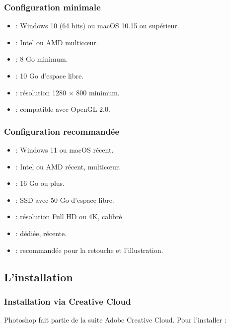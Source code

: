 \subsubsection{Configuration minimale}

\begin{itemize}
    \item {} : Windows 10 (64 bits) ou macOS 10.15 ou supérieur.
    \item {} : Intel ou AMD multicœur.
    \item {} : 8 Go minimum.
    \item {} : 10 Go d'espace libre.
    \item {} : résolution 1280 × 800 minimum.
    \item {} : compatible avec OpenGL 2.0.
\end{itemize}

\subsubsection{Configuration recommandée}

\begin{itemize}
    \item {} : Windows 11 ou macOS récent.
    \item {} : Intel ou AMD récent, multicœur.
    \item {} : 16 Go ou plus.
    \item {} : SSD avec 50 Go d'espace libre.
    \item {} : résolution Full HD ou 4K, calibré.
    \item {} : dédiée, récente.
    \item {} : recommandée pour la retouche et l'illustration.
\end{itemize}

\subsection{L'installation}

\subsubsection{Installation via Creative Cloud}

Photoshop fait partie de la suite Adobe Creative Cloud. Pour l'installer :

